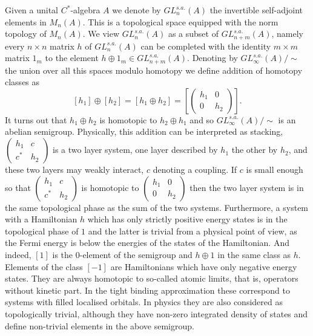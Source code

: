 \documentclass[11pt]{amsart}
\begin{document}
Given a unital $C^*$-algebra $A$ we denote by $GL_n^{s.a.}(A)$ the invertible self-adjoint elements in $M_n(A)$. This is a topological space equipped with the norm topology of $M_n(A)$.
We view $GL_n^{s.a.}(A)$ as a subset of $GL_{n+m}^{s.a.}(A)$, namely every $n\times n$ matrix $h$ of $GL_n^{s.a.}(A)$ can be completed with the identity $m\times m$ matrix $1_m$ to the element $h\oplus 1_m\in GL_{n+m}^{s.a.}(A)$. Denoting by $GL_\infty^{s.a.}(A)/\sim$ the union over all this spaces modulo homotopy we define addition of homotopy classes as 
$$[h_1]\oplus [h_2]=[h_1\oplus h_2]=\left[\begin{pmatrix}
h_1 & 0\\
0 & h_2
\end{pmatrix}\right].$$
It turns out that $h_1\oplus h_2$ is homotopic to $h_2\oplus h_1$ and so $GL_\infty^{s.a.}(A)/\sim$ is an abelian semigroup. Physically, this addition can be interpreted as stacking, $\begin{pmatrix}
h_1 & c\\
c^* & h_2
\end{pmatrix}$ is a two layer system, one layer described by $h_1$ the other by $h_2$, and these two layers may weakly interact, $c$ denoting a coupling. If $c$ is small enough so that $\begin{pmatrix}
h_1 & c\\
c^* & h_2
\end{pmatrix}$ is homotopic to $\begin{pmatrix}
h_1 & 0\\
0 & h_2
\end{pmatrix}$
then the two layer system is in the same topological phase as the sum of the two systems. Furthermore, a system with a Hamiltonian $h$ which has only strictly positive energy states is in the topological phase of $1$ and the latter is trivial from a physical point of view, as the Fermi energy is below the energies of the states of the Hamiltonian. And indeed, $[1]$ is the $0$-element of the semigroup and $h\oplus 1$ in the same class as $h$.
Elements of the class $[-1]$ are Hamiltonians which have only negative energy states. They are always homotopic to so-called atomic limits, that is, operators without kinetic part. In the tight binding approximation these correspond to systems with filled localised orbitals. In physics they are also considered as topologically trivial, although they have non-zero integrated density of states and define non-trivial elements in the above semigroup. 
\end{document}
